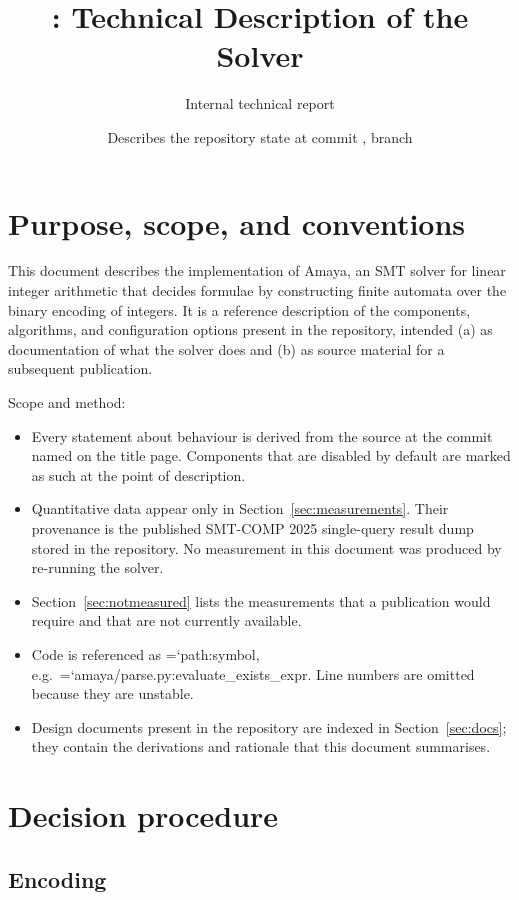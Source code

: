 \documentclass[10pt,a4paper]{article}
\title{\amaya{}: Technical Description of the Solver}
\author{Internal technical report}
\date{Describes the repository state at commit \code{b3fc4d3}, branch \code{devel}}
\newcommand{\amaya}{Amaya}
\newcommand{\code}[1]{{\small\ttfamily\hyphenchar\font=`\-\relax #1}}
\begin{document}
\maketitle

\section{Purpose, scope, and conventions}
\label{sec:scope}

This document describes the implementation of \amaya{}, an SMT solver for linear integer arithmetic
that decides formulae by constructing finite automata over the binary encoding of integers.  It is a
reference description of the components, algorithms, and configuration options present in the
repository, intended (a) as documentation of what the solver does and (b) as source material for a
subsequent publication.

Scope and method:

\begin{itemize}
  \item Every statement about behaviour is derived from the source at the commit named on the title
        page.  Components that are disabled by default are marked as such at the point of
        description.
  \item Quantitative data appear only in Section~\ref{sec:measurements}.  Their provenance is the
        published SMT-COMP 2025 single-query result dump stored in the repository.  No measurement in
        this document was produced by re-running the solver.
  \item Section~\ref{sec:notmeasured} lists the measurements that a publication would require and
        that are not currently available.
  \item Code is referenced as \code{path:symbol}, e.g.\ \code{amaya/parse.py:\allowbreak evaluate\_\allowbreak exists\_\allowbreak expr}.
        Line numbers are omitted because they are unstable.
  \item Design documents present in the repository are indexed in Section~\ref{sec:docs}; they
        contain the derivations and rationale that this document summarises.
\end{itemize}

\section{Decision procedure}
\label{sec:procedure}

\subsection{Encoding}
\end{document}
